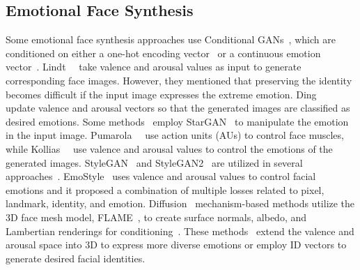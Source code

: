 \subsection{Emotional Face Synthesis}
%
Some emotional face synthesis approaches use Conditional GANs~\cite{mirza2014conditional}, which are conditioned on either a one-hot encoding vector~\cite{ding2018exprgan} or a continuous emotion vector~\cite{lindt2019facial,d2021ganmut}. Lindt~\etal~\cite{lindt2019facial} take valence and arousal values as input to generate corresponding face images. However, they mentioned that preserving the identity becomes difficult if the input image expresses the extreme emotion. Ding~\etal~\cite{d2021ganmut} update valence and arousal vectors so that the generated images are classified as desired emotions.
%
Some methods~\cite{pumarola2018ganimation,kollias2020va} employ StarGAN~\cite{choi2018stargan} to manipulate the emotion in the input image. Pumarola~\etal~\cite{pumarola2018ganimation} use action units (AUs) to control face muscles, while Kollias~\etal~\cite{kollias2020va} use valence and arousal values to control the emotions of the generated images. StyleGAN~\cite{choi2018stargan} and StyleGAN2~\cite{karras2020analyzing} are utilized in several approaches~\cite{abdal2021styleflow,harkonen2020ganspace,khodadadeh2022latent,patashnik2021styleclip,shen2020interpreting,azari2024emostyle}. 
EmoStyle~\cite{azari2024emostyle} uses valence and arousal values to control facial emotions and it proposed a combination of multiple losses related to pixel, landmark, identity, and emotion.
%
Diffusion~\cite{ho2020denoising,song2020denoising} mechanism-based methods utilize the 3D face mesh model, FLAME~\cite{li2017learning}, to create surface normals, albedo, and Lambertian renderings for conditioning~\cite{ding2023diffusionrig}. These methods~\cite{paskaleva2024unified, paraperas2024arc2face} extend the valence and arousal space into 3D to express more diverse emotions or employ ID vectors to generate desired facial identities.

